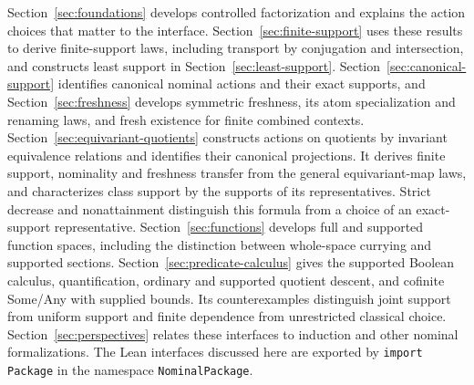 Section~\ref{sec:foundations} develops controlled factorization and explains
the action choices that matter to the interface. Section~\ref{sec:finite-support}
uses these results to derive finite-support laws, including transport by
conjugation and intersection, and constructs least support in
Section~\ref{sec:least-support}. Section~\ref{sec:canonical-support} identifies
canonical nominal actions and their exact supports, and
Section~\ref{sec:freshness} develops symmetric freshness, its atom
specialization and renaming laws, and fresh existence for finite combined contexts.
Section~\ref{sec:equivariant-quotients} constructs actions on quotients by
invariant equivalence relations and identifies their canonical projections.
It derives finite support, nominality and freshness transfer from the general
equivariant-map laws, and characterizes class support by the supports of its
representatives. Strict decrease and nonattainment distinguish this formula
from a choice of an exact-support representative.
Section~\ref{sec:functions} develops full and supported function spaces,
including the distinction between whole-space currying and supported sections.
Section~\ref{sec:predicate-calculus} gives the supported Boolean calculus,
quantification, ordinary and supported quotient descent, and cofinite
Some/Any with supplied bounds. Its counterexamples distinguish joint support
from uniform support and finite dependence from unrestricted classical choice.
Section~\ref{sec:perspectives} relates these interfaces to induction and
other nominal formalizations.
The Lean interfaces discussed here are exported by
\texttt{import Package} in the namespace \texttt{NominalPackage}.
